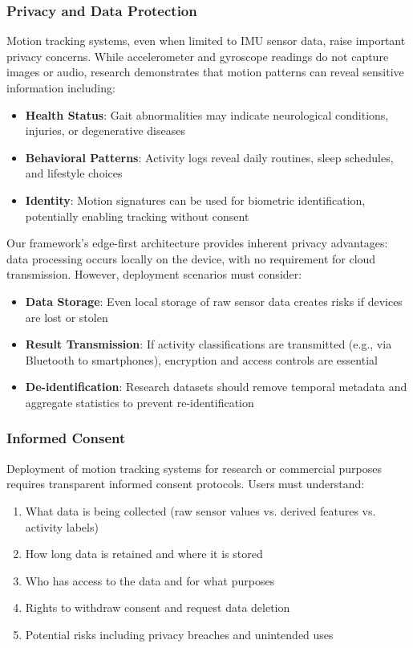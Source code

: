\subsubsection{Privacy and Data Protection}
Motion tracking systems, even when limited to IMU sensor data, raise important privacy concerns. While accelerometer and gyroscope readings do not capture images or audio, research demonstrates that motion patterns can reveal sensitive information including:
\begin{itemize}
    \item \textbf{Health Status}: Gait abnormalities may indicate neurological conditions, injuries, or degenerative diseases
    \item \textbf{Behavioral Patterns}: Activity logs reveal daily routines, sleep schedules, and lifestyle choices
    \item \textbf{Identity}: Motion signatures can be used for biometric identification, potentially enabling tracking without consent
\end{itemize}

Our framework's edge-first architecture provides inherent privacy advantages: data processing occurs locally on the device, with no requirement for cloud transmission. However, deployment scenarios must consider:
\begin{itemize}
    \item \textbf{Data Storage}: Even local storage of raw sensor data creates risks if devices are lost or stolen
    \item \textbf{Result Transmission}: If activity classifications are transmitted (e.g., via Bluetooth to smartphones), encryption and access controls are essential
    \item \textbf{De-identification}: Research datasets should remove temporal metadata and aggregate statistics to prevent re-identification
\end{itemize}

\subsubsection{Informed Consent}
Deployment of motion tracking systems for research or commercial purposes requires transparent informed consent protocols. Users must understand:
\begin{enumerate}
    \item What data is being collected (raw sensor values vs. derived features vs. activity labels)
    \item How long data is retained and where it is stored
    \item Who has access to the data and for what purposes
    \item Rights to withdraw consent and request data deletion
    \item Potential risks including privacy breaches and unintended uses
\end{enumerate}

